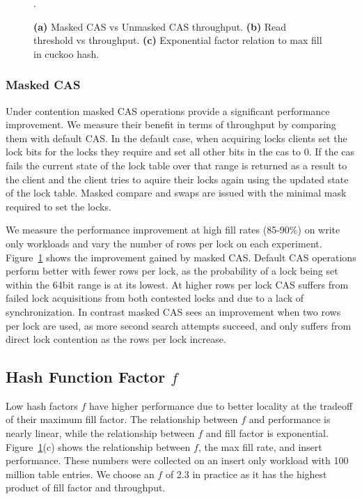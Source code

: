 \begin{figure}[t]
\begin{subfigure}{0.3\linewidth}
    \end{subfigure}.
    \vspace{-1em}
    \caption{
    \textbf{(a)} Masked CAS vs Unmasked CAS throughput.
    \textbf{(b)} Read threshold vs throughput.
    \textbf{(c)} Exponential factor relation to max fill in cuckoo hash.
    }
    \label{fig:performance_breakdown}

\end{figure}

\subsubsection{Masked CAS}

Under contention masked CAS operations provide a significant
performance improvement. We measure their benefit in terms
of throughput by comparing them with default CAS. In the
default case, when acquiring locks clients set the lock bits
for the locks they require and set all other bits in the cas
to 0. If the cas fails the current state of the lock table
over that range is returned as a result to the client and
the client tries to aquire their locks again using the
updated state of the lock table. Masked compare and swaps
are issued with the minimal mask required to set the locks.

We measure the performance improvement at high fill rates
(85-90\%) on write only workloads and vary the number of
rows per lock on each experiment.
Figure~\ref{fig:performance_breakdown} shows the improvement
gained by masked CAS. Default CAS operations perform better
with fewer rows per lock, as the probability of a lock being
set within the 64bit range is at its lowest. At higher rows
per lock CAS suffers from failed lock acquisitions from both
contested locks and due to a lack of synchronization. In
contrast masked CAS sees an improvement when two rows per
lock are used, as more second search attempts succeed, and
only suffers from direct lock contention as the rows per
lock increase.


\subsection{Hash Function Factor $f$}

Low hash factors $f$ have higher performance due to better
locality at the tradeoff of their maximum fill factor. The
relationship between $f$ and performance is nearly linear,
while the relationship between $f$ and fill factor is
exponential. Figure~\ref{fig:performance_breakdown}(c) shows
the relationship between $f$, the max fill rate, and insert
performance. These numbers were collected on an insert only
workload with 100 million table entries. We choose an $f$ of
2.3 in practice as it has the highest product of fill factor
and throughput.

